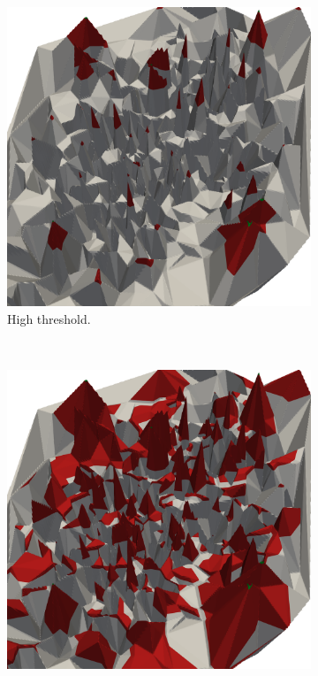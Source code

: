 \begin{figure}[t]
  \centering
	\begin{subfigure}[b]{0.33\textwidth}
    \includegraphics[width=\textwidth]{figures/coolidge-af-high-threshold.png}
		\caption{High threshold.}
		\label{fig:lvars-bench-cores}
	\end{subfigure}
	~
	\begin{subfigure}[b]{0.33\textwidth}
    \includegraphics[width=\textwidth]{figures/coolidge-af-med-threshold.png}

\end{subfigure}
\end{figure}
